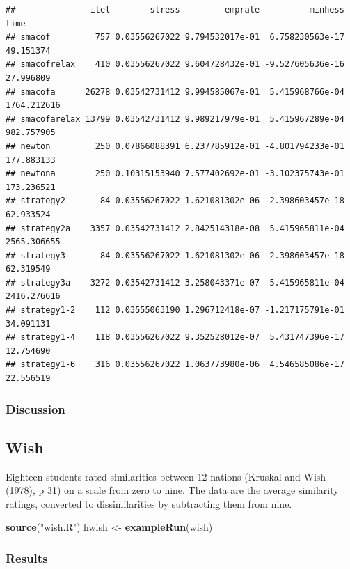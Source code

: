 \documentclass[
  12pt,
]{article}
\newenvironment{Shaded}{\begin{snugshade}}{\end{snugshade}}
\newcommand{\FunctionTok}[1]{\textcolor[rgb]{0.13,0.29,0.53}{\textbf{#1}}}
\newcommand{\NormalTok}[1]{#1}
\newcommand{\OtherTok}[1]{\textcolor[rgb]{0.56,0.35,0.01}{#1}}
\newcommand{\StringTok}[1]{\textcolor[rgb]{0.31,0.60,0.02}{#1}}
\begin{document}
\begin{verbatim}
##               itel        stress         emprate          minhess        time
## smacof         757 0.03556267022 9.794532017e-01  6.758230563e-17   49.151374
## smacofrelax    410 0.03556267022 9.604728432e-01 -9.527605636e-16   27.996809
## smacofa      26278 0.03542731412 9.994585067e-01  5.415968766e-04 1764.212616
## smacofarelax 13799 0.03542731412 9.989217979e-01  5.415967289e-04  982.757905
## newton         250 0.07866088391 6.237785912e-01 -4.801794233e-01  177.883133
## newtona        250 0.10315153940 7.577402692e-01 -3.102375743e-01  173.236521
## strategy2       84 0.03556267022 1.621081302e-06 -2.398603457e-18   62.933524
## strategy2a    3357 0.03542731412 2.842514318e-08  5.415965811e-04 2565.306655
## strategy3       84 0.03556267022 1.621081302e-06 -2.398603457e-18   62.319549
## strategy3a    3272 0.03542731412 3.258043371e-07  5.415965811e-04 2416.276616
## strategy1-2    112 0.03555063190 1.296712418e-07 -1.217175791e-01   34.091131
## strategy1-4    118 0.03556267022 9.352528012e-07  5.431747396e-17   12.754690
## strategy1-6    316 0.03556267022 1.063773980e-06  4.546585086e-17   22.556519
\end{verbatim}

\subsubsection{Discussion}\label{discussion-5}

\subsection{Wish}\label{wish}

Eighteen students rated similarities between
12 nations (Kruskal and Wish (1978), p 31) on a scale from zero to nine. The data are the average similarity ratings, converted to dissimilarities by subtracting them from nine.

\begin{Shaded}
\begin{Highlighting}[]
\FunctionTok{source}\NormalTok{(}\StringTok{"wish.R"}\NormalTok{)}
\NormalTok{hwish }\OtherTok{\textless{}{-}} \FunctionTok{exampleRun}\NormalTok{(wish)}
\end{Highlighting}
\end{Shaded}

\subsubsection{Results}\label{results-6}
\end{document}
